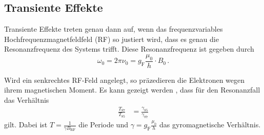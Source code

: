 \subsection{Transiente Effekte}

Transiente Effekte treten genau dann auf, wenn das frequenzvariables Hochfrequenzmagnetfeldfeld (RF) so justiert wird, dass es genau die Resonanzfrequenz des Systems trifft.
Diese Resonanzfrequenz ist gegeben durch
\begin{equation*}
    \omega_0 = 2 \pi \nu_0 = g_\text{F} \frac{\mu_0}{h} \cdot B_0 \, .
\end{equation*}

Wird ein senkrechtes RF-Feld angelegt, so präzedieren die Elektronen wegen ihrem magnetischen Moment.
Es kann gezeigt werden \cite{optical_pumping}, dass für den Resonanzfall das Verhältnis 
\begin{align}
  \label{eq:resonanz_perioden}
  \frac{T_{87}}{T_{85}} &= \frac{\gamma_{85}}{\gamma_{87}}
\end{align}
gilt. Dabei ist $T = \frac{1}{\gamma B_\text{RF}}$ die Periode und $\gamma = g_\text{F} \frac{\mu_0}{h}$ das gyromagnetische Verhältnis.